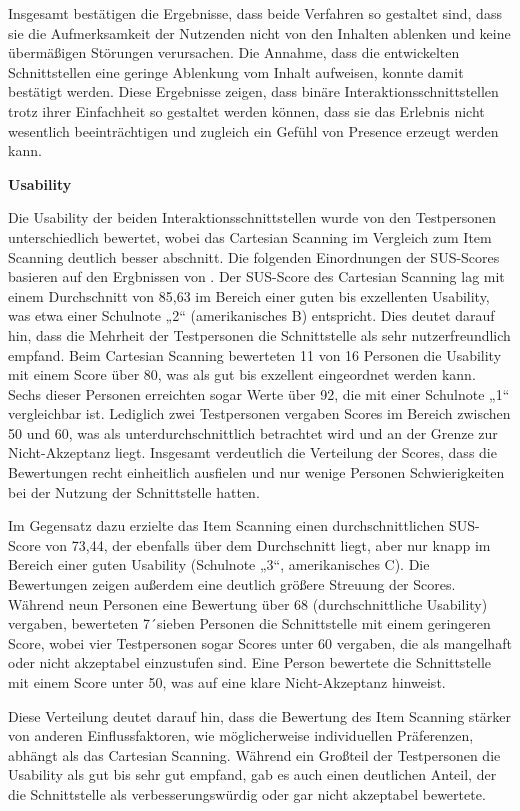 Insgesamt bestätigen die Ergebnisse, dass beide Verfahren so gestaltet sind, dass sie die Aufmerksamkeit der Nutzenden nicht von den Inhalten ablenken und keine übermäßigen Störungen verursachen. Die Annahme, dass die entwickelten Schnittstellen eine geringe Ablenkung vom Inhalt aufweisen, konnte damit bestätigt werden. Diese Ergebnisse zeigen, dass binäre Interaktionsschnittstellen trotz ihrer Einfachheit so gestaltet werden können, dass sie das Erlebnis nicht wesentlich beeinträchtigen und zugleich ein Gefühl von Presence erzeugt werden kann.

\textbf{Usability}

Die Usability der beiden Interaktionsschnittstellen wurde von den Testpersonen unterschiedlich bewertet, wobei das Cartesian Scanning im Vergleich zum Item Scanning deutlich besser abschnitt. Die folgenden Einordnungen der SUS-Scores basieren auf den Ergbnissen von \citet{bangor_empirical_2008}. Der SUS-Score des Cartesian Scanning lag mit einem Durchschnitt von 85,63 im Bereich einer guten bis exzellenten Usability, was etwa einer Schulnote „2“ (amerikanisches B) entspricht. Dies deutet darauf hin, dass die Mehrheit der Testpersonen die Schnittstelle als sehr nutzerfreundlich empfand.
Beim Cartesian Scanning bewerteten 11 von 16 Personen die Usability mit einem Score über 80, was als gut bis exzellent eingeordnet werden kann. Sechs dieser Personen erreichten sogar Werte über 92, die mit einer Schulnote „1“ vergleichbar ist. Lediglich zwei Testpersonen vergaben Scores im Bereich zwischen 50 und 60, was als unterdurchschnittlich betrachtet wird und an der Grenze zur Nicht-Akzeptanz liegt. Insgesamt verdeutlich die Verteilung der Scores, dass die Bewertungen recht einheitlich ausfielen und nur wenige Personen Schwierigkeiten bei der Nutzung der Schnittstelle hatten.

Im Gegensatz dazu erzielte das Item Scanning einen durchschnittlichen SUS-Score von 73,44, der ebenfalls über dem Durchschnitt liegt, aber nur knapp im Bereich einer guten Usability (Schulnote „3“, amerikanisches C). Die Bewertungen zeigen außerdem eine deutlich größere Streuung der Scores. Während neun Personen eine Bewertung über 68 (durchschnittliche Usability) vergaben, bewerteten 7´sieben Personen die Schnittstelle mit einem geringeren Score, wobei vier Testpersonen sogar Scores unter 60 vergaben, die als mangelhaft oder nicht akzeptabel einzustufen sind. Eine Person bewertete die Schnittstelle mit einem Score unter 50, was auf eine klare Nicht-Akzeptanz hinweist.

Diese Verteilung deutet darauf hin, dass die Bewertung des Item Scanning stärker von anderen Einflussfaktoren, wie möglicherweise individuellen Präferenzen, abhängt als das Cartesian Scanning. Während ein Großteil der Testpersonen die Usability als gut bis sehr gut empfand, gab es auch einen deutlichen Anteil, der die Schnittstelle als verbesserungswürdig oder gar nicht akzeptabel bewertete.

